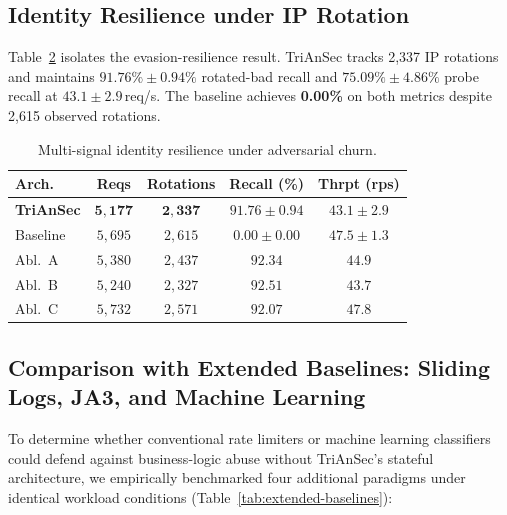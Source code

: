 \documentclass[journal,10pt]{IEEEtran}
\begin{document}
\begin{table}[!t]
\subsection{Identity Resilience under IP Rotation}
Table~\ref{tab:rotation} isolates the evasion-resilience result. TriAnSec tracks 2,337 IP rotations and maintains $91.76\%\pm0.94\%$ rotated-bad recall and $75.09\%\pm4.86\%$ probe recall at $43.1\pm2.9$\,req/s. The baseline achieves \textbf{0.00\%} on both metrics despite 2,615 observed rotations.

\begin{table}[!t]
\centering
\caption{Multi-signal identity resilience under adversarial churn.}
\label{tab:rotation}
\renewcommand{\arraystretch}{1.1}
\setlength{\tabcolsep}{3pt}
\small
\begin{tabular}{@{}lcccc@{}}
\toprule
\textbf{Arch.} & \textbf{Reqs} & \textbf{Rotations} & \textbf{Recall (\%)} & \textbf{Thrpt (rps)}\\
\midrule
\textbf{TriAnSec} & $\mathbf{5{,}177}$ & $\mathbf{2{,}337}$ & $\mathbf{91.76\pm0.94}$ & $\mathbf{43.1\pm2.9}$\\
Baseline  & $5{,}695$ & $2{,}615$ & $0.00\pm0.00$ & $47.5\pm1.3$\\
Abl.\ A   & $5{,}380$ & $2{,}437$ & $92.34$ & $44.9$\\
Abl.\ B   & $5{,}240$ & $2{,}327$ & $92.51$ & $43.7$\\
Abl.\ C   & $5{,}732$ & $2{,}571$ & $92.07$ & $47.8$\\
\bottomrule
\end{tabular}
\end{table}

\subsection{Comparison with Extended Baselines: Sliding Logs, JA3, and Machine Learning}
To determine whether conventional rate limiters or machine learning classifiers could defend against business-logic abuse without TriAnSec's stateful architecture, we empirically benchmarked four additional paradigms under identical workload conditions (Table~\ref{tab:extended-baselines}):


\end{table}
\end{document}
